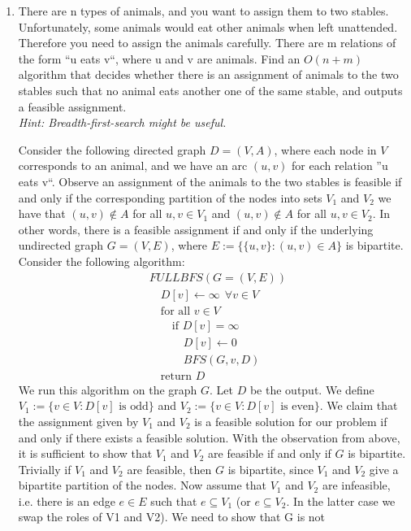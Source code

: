 \documentclass[11pt]{article}
\begin{document}
\begin{enumerate}[1)]
\item There are n types of animals, and you want to assign them to two stables. Unfortunately,
some animals would eat other animals when left unattended. Therefore you need to assign
the animals carefully. There are m relations of the form “u eats v“, where u and v are animals.
Find an $O(n + m)$ algorithm that decides whether there is an assignment of animals to the
two stables such that no animal eats another one of the same stable, and outputs a feasible
assignment.\\
\textit{Hint: Breadth-first-search might be useful.}

\begin{solution}
Consider the following directed graph $D = (V, A)$, where each node in $V$ corresponds to an
animal, and we have an arc $(u, v)$ for each relation ”u eats v“. Observe an assignment of the
animals to the two stables is feasible if and only if the corresponding partition of the nodes
into sets $V_1$ and $V_2$ we have that $(u, v) ∉ A$ for all $u, v ∈ V_1$ and $(u, v) ∉ A$ for all $u, v ∈ V_2$.
In other words, there is a feasible assignment if and only if the underlying undirected
graph $G= (V,E )$, where $E := \{\{u, v\} : (u, v) ∈ A\}$ is bipartite.
Consider the following algorithm:
\begin{align*}
&FULLBFS(G= (V,E )) \\
& \quad D[v] \leftarrow \infty \ \ ∀v ∈ V \\
& \quad \text{for all }v ∈ V \\
& \quad \quad \text{if } D[v]= \infty \\
&\quad \quad \quad D[v]\leftarrow 0 \\
& \quad \quad \quad BFS(G, v, D) \\
& \quad \text{return } D
\end{align*}
We run this algorithm on the graph $G$. Let $D$ be the output. We define
$V_1 := \{v ∈ V : D[v]\text{ is odd}\}$
and
$V_2 := \{v ∈ V : D[v]\text{ is even}\}$.
We claim that the assignment given by $V_1$ and $V_2$ is a feasible solution for our problem if and
only if there exists a feasible solution. With the observation from above, it is sufficient to
show that $V_1$ and $V_2$ are feasible if and only if $G$ is bipartite.
Trivially if $V_1$ and $V_2$ are feasible, then $G$ is bipartite, since $V_1$ and $V_2$ give a bipartite partition of the nodes.
Now assume that $V_1$ and $V_2$ are infeasible, i.e. there is an edge $e ∈ E$ such that $e ⊆ V_1$ (or
$e ⊆ V_2$. In the latter case we swap the roles of V1 and V2). We need to show that G is not

\end{solution}
\end{enumerate}
\end{document}

